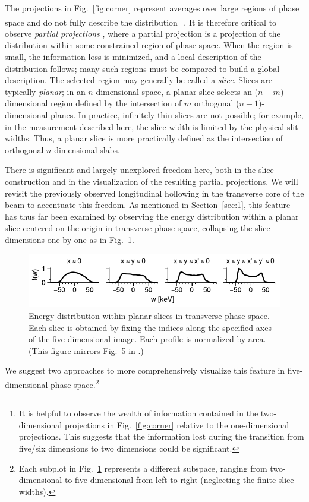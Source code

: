 \documentclass[%
 reprint,
nofootinbib,
 amsmath,amssymb,
 aps,
prstab,
]{revtex4-2}
\begin{document}
The projections in Fig.~\ref{fig:corner} represent averages over large regions of phase space and do not fully describe the distribution \footnote{It is helpful to observe the wealth of information contained in the two-dimensional projections in Fig.~\ref{fig:corner} relative to the one-dimensional projections. This suggests that the information lost during the transition from five/six dimensions to two dimensions could be significant.}. It is therefore critical to observe \textit{partial projections} \cite{Cathey2018, Ruisard2020}, where a partial projection is a projection of the distribution within some constrained region of phase space. When the region is small, the information loss is minimized, and a local description of the distribution follows; many such regions must be compared to build a global description. The selected region may generally be called a \textit{slice}. Slices are typically \textit{planar}; in an $n$-dimensional space, a planar slice selects an ($n - m$)-dimensional region defined by the intersection of $m$ orthogonal ($n - 1$)-dimensional planes. In practice, infinitely thin slices are not possible; for example, in the measurement described here, the slice width is limited by the physical slit widths. Thus, a planar slice is more practically defined as the intersection of orthogonal $n$-dimensional slabs.

There is significant and largely unexplored freedom here, both in the slice construction and in the visualization of the resulting partial projections. We will revisit the previously observed longitudinal hollowing in the transverse core of the beam to accentuate this freedom. As mentioned in Section~\ref{sec:1}, this feature has thus far been examined by observing the energy distribution within a planar slice centered on the origin in transverse phase space, collapsing the slice dimensions one by one as in Fig.~\ref{fig:hollow_energy_a}.
%
\begin{figure}
    \centering
    \includegraphics[width=\columnwidth]{fig_fw_slices.pdf}
    \caption{Energy distribution within planar slices in transverse phase space. Each slice is obtained by fixing the indices along the specified axes of the five-dimensional image. Each profile is normalized by area. (This figure mirrors Fig.~5 in \cite{Cathey2018}.)}
    \label{fig:hollow_energy_a}
\end{figure}
%
We suggest two approaches to more comprehensively visualize this feature in five-dimensional phase space.\footnote{Each subplot in Fig.~\ref{fig:hollow_energy_a} represents a different subspace, ranging from two-dimensional to five-dimensional from left to right (neglecting the finite slice widths).}
\end{document}
